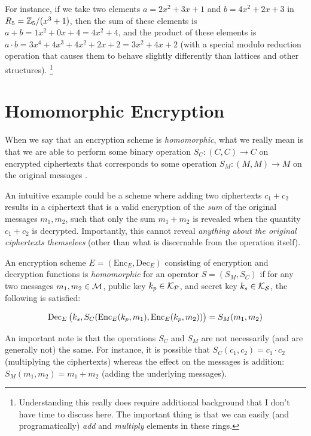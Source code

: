 \documentclass{theme}
\newcommand{\Enc}{\text{Enc}}
\newcommand{\Dec}{\text{Dec}}
\begin{document}
For instance, if we take two elements $a = 2x^2 + 3x + 1$ and $b = 4x^2 + 2x + 3$ in $R_5 = \mathbb{Z}_5/(x^3 + 1)$, then the sum of these elements is $a + b = 1x^2 + 0x + 4 = 4x^2 + 4$, and the product of these elements is $a \cdot b = 3x^4 + 4x^3 + 4x^2 + 2x + 2 = 3x^2 + 4x + 2$ (with a special modulo reduction operation that causes them to behave slightly differently than lattices and other structures). \footnote{Understanding this really does require additional background that I don't have time to discuss here. The important thing is that we can easily (and programatically) \textit{add} and \textit{multiply} elements in these rings.}

\section{Homomorphic Encryption}

When we say that an encryption scheme is \textit{homomorphic}, what we really mean is that we are able to perform some binary operation $S_C: (C,C) \to C$ on encrypted ciphertexts that corresponds to some operation $S_M: (M, M) \to M$ on the original messages \cite{fhe}.

An intuitive example could be a scheme where adding two ciphertexts $c_1 + c_2$ results in a ciphertext that is a valid encryption of the \textit{sum} of the original messages $m_1,m_2$, such that only the sum $m_1 + m_2$ is revealed when the quantity $c_1 + c_2$ is decrypted. Importantly, this cannot reveal \textit{anything about the original ciphertexts themselves} (other than what is discernable from the operation itself).

\begin{ndefinition}
    An encryption scheme $E = (\Enc_E, \Dec_E)$ consisting of encryption and decryption functions is \textit{homomorphic} for an operator $S = (S_M, S_C)$ if for any two messages $m_1, m_2 \in \mathcal{M}$, public key $k_p \in \mathcal{K_P}$, and secret key $k_s \in \mathcal{K_S}$, the following is satisfied:

    \begin{equation}
        \Dec_E\p{k_s, S_C(\Enc_E(k_p, m_1), \Enc_E(k_p, m_2))} = S_M(m_1, m_2)
    \end{equation}
\end{ndefinition}

An important note is that the operations $S_C$ and $S_M$ are not necessarily (and are generally not) the same. For instance, it is possible that $S_C(c_1, c_2) = c_1 \cdot c_2$ (multiplying the ciphertexts) whereas the effect on the messages is addition: $S_M(m_1, m_2) = m_1 + m_2$ (adding the underlying messages).
\end{document}
